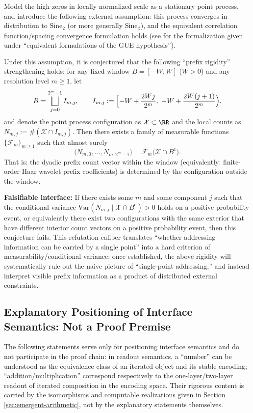 \begin{conjecture}\label{conj:discussion-zeta-prefix-rigidity}
Model the high zeros in locally normalized scale as a stationary point process, and introduce the following external assumption: this process converges in distribution to \(\mathrm{Sine}_{2}\) (or more generally \(\mathrm{Sine}_{\beta}\)), and the equivalent correlation function/spacing convergence formulation holds (see \cite{AriasDeReynaRodgers2024ConvergencePointsZetaZeros} for the formalization given under ``equivalent formulations of the GUE hypothesis'').
\par
Under this assumption, it is conjectured that the following ``prefix rigidity'' strengthening holds: for any fixed window \(B=[-W,W]\) (\(W>0\)) and any resolution level \(m\ge 1\), let
\[
B=\bigsqcup_{j=0}^{2^{m}-1} I_{m,j},
\qquad
I_{m,j}:=\Bigl[-W+\frac{2Wj}{2^{m}},\ -W+\frac{2W(j+1)}{2^{m}}\Bigr),
\]
and denote the point process configuration as \(\mathcal X\subset\RR\) and the local counts as \(N_{m,j}:=\#(\mathcal X\cap I_{m,j})\).
Then there exists a family of measurable functions \(\{\mathcal F_m\}_{m\ge 1}\) such that almost surely
\[
\bigl(N_{m,0},\dots,N_{m,2^{m}-1}\bigr)
=\mathcal F_m\!\bigl(\mathcal X\cap B^{\mathrm c}\bigr).
\]
That is: the dyadic prefix count vector within the window (equivalently: finite-order Haar wavelet prefix coefficients) is determined by the configuration outside the window.
\par
\textbf{Falsifiable interface:} If there exists some \(m\) and some component \(j\) such that the conditional variance
\(
\mathrm{Var}(N_{m,j}\mid \mathcal X\cap B^{\mathrm c})>0
\)
holds on a positive probability event, or equivalently there exist two configurations with the same exterior that have different interior count vectors on a positive probability event, then this conjecture fails.
This refutation caliber translates ``whether addressing information can be carried by a single point'' into a hard criterion of measurability/conditional variance: once established, the above rigidity will systematically rule out the naive picture of ``single-point addressing,'' and instead interpret visible prefix information as a product of distributed external constraints.
\end{conjecture}

\subsection{Explanatory Positioning of Interface Semantics: Not a Proof Premise}\label{subsec:discussion-semantic-positioning}
The following statements serve only for positioning interface semantics and do not participate in the proof chain: in readout semantics, a ``number'' can be understood as the equivalence class of an iterated object and its stable encoding; ``addition/multiplication'' correspond respectively to the one-layer/two-layer readout of iterated composition in the encoding space. Their rigorous content is carried by the isomorphisms and computable realizations given in Section \ref{sec:emergent-arithmetic}, not by the explanatory statements themselves.
